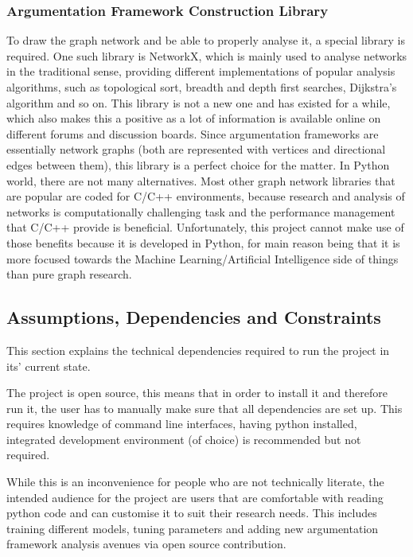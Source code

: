         \subsubsection{Argumentation Framework Construction Library}
            To draw the graph network and be able to properly analyse it, a special library is required. One such library is NetworkX, which is mainly used to analyse networks in the traditional sense, providing different implementations of popular analysis algorithms, such as topological sort, breadth and depth first searches, Dijkstra's algorithm and so on. This library is not a new one and has existed for a while, which also makes this a positive as a lot of information is available online on different forums and discussion boards. Since argumentation frameworks are essentially network graphs (both are represented with vertices and directional edges between them), this library is a perfect choice for the matter. In Python world, there are not many alternatives. Most other graph network libraries that are popular are coded for C/C++ environments, because research and analysis of networks is computationally challenging task and the performance management that C/C++ provide is beneficial. Unfortunately, this project cannot make use of those benefits because it is developed in Python, for main reason being that it is more focused towards the Machine Learning/Artificial Intelligence side of things than pure graph research.
        
    \subsection{Assumptions, Dependencies and Constraints} \label{assumptionsdependencies}
        This section explains the technical dependencies required to run the project in its' current state.
        
        The project is open source, this means that in order to install it and therefore run it, the user has to manually make sure that all dependencies are set up. This requires knowledge of command line interfaces, having python installed, integrated development environment (of choice) is recommended but not required.
        
        While this is an inconvenience for people who are not technically literate, the intended audience for the project are users that are comfortable with reading python code and can customise it to suit their research needs. This includes training different models, tuning parameters and adding new argumentation framework analysis avenues via open source contribution.
        
